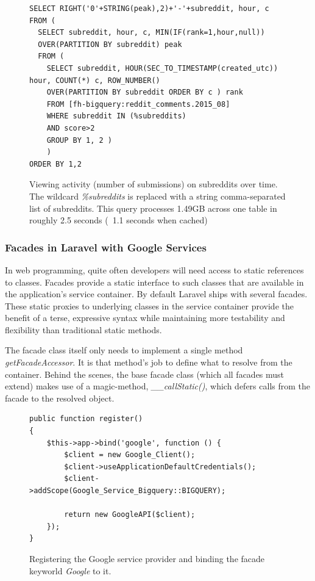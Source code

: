 \documentclass[msc,oneside]{ubcthesis}%
\begin{document}
\begin{figure}[!htb]
\begin{lstlisting}
SELECT RIGHT('0'+STRING(peak),2)+'-'+subreddit, hour, c 
FROM (
  SELECT subreddit, hour, c, MIN(IF(rank=1,hour,null)) 
  OVER(PARTITION BY subreddit) peak 
  FROM (
    SELECT subreddit, HOUR(SEC_TO_TIMESTAMP(created_utc)) hour, COUNT(*) c, ROW_NUMBER() 
    OVER(PARTITION BY subreddit ORDER BY c ) rank 
    FROM [fh-bigquery:reddit_comments.2015_08] 
    WHERE subreddit IN (%subreddits) 
    AND score>2 
    GROUP BY 1, 2 )
    )
ORDER BY 1,2
\end{lstlisting}
\caption[Query finding the best hours to post on Reddit]{
Viewing activity (number of submissions) on subreddits over time. The wildcard \textit{\%subreddits} is replaced with a string comma-separated list of subreddits. This query processes 1.49GB across one table in roughly 2.5 seconds (~1.1 seconds when cached)}
\end{figure}

\subsubsection{Facades in Laravel with Google Services}
In web programming, quite often developers will need access to static references to classes. Facades provide a static interface to such classes that are available in the application's service container. By default Laravel ships with several facades. These static proxies to underlying classes in the service container provide the benefit of a terse, expressive syntax while maintaining more testability and flexibility than traditional static methods.
\par
The facade class itself only needs to implement a single method \textit{getFacadeAccessor}. It is that method's job to define what to resolve from the container. Behind the scenes, the base facade class (which all facades must extend) makes use of a magic-method, \textit{\_\_callStatic()}, which defers calls from the facade to the resolved object. 

\begin{figure}[!htb]
\begin{lstlisting}
public function register()
{
	$this->app->bind('google', function () {
		$client = new Google_Client();
		$client->useApplicationDefaultCredentials();
		$client->addScope(Google_Service_Bigquery::BIGQUERY);
		
		return new GoogleAPI($client);
	});
}
\end{lstlisting}
\caption[Registering the Google service provider]{
Registering the Google service provider and binding the facade keyworld \textit{Google} to it.}
\end{figure}
\end{document}
